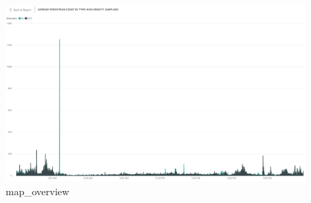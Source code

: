 \documentclass[11pt]{article}
\makeatletter
\def\maxwidth{\ifdim\Gin@nat@width>\linewidth\linewidth
    \else\Gin@nat@width\fi}
\let\Oldincludegraphics\includegraphics
\renewcommand{\includegraphics}[1]{\Oldincludegraphics[width=.8\maxwidth]{#1}}
\makeatother
\begin{document}
    \begin{figure}
\centering
\includegraphics{images/pedestrian_count_avg_hourly.png}
\caption{map\_overview}
\end{figure}
\end{document}
